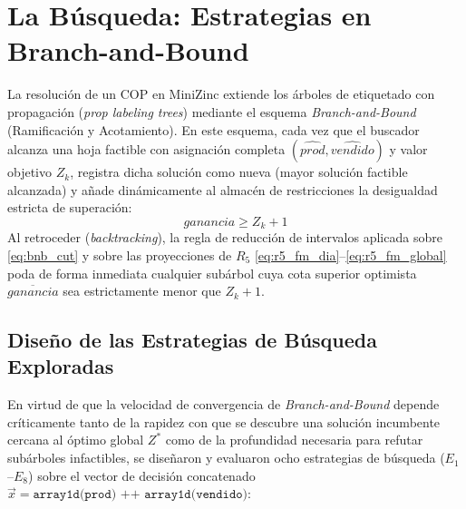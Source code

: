\section{La Búsqueda: Estrategias en Branch-and-Bound}
\label{sec:busqueda}

La resolución de un COP en MiniZinc extiende los árboles de etiquetado con propagación (\emph{prop labeling trees}) mediante el esquema \emph{Branch-and-Bound} (Ramificación y Acotamiento). En este esquema, cada vez que el buscador alcanza una hoja factible con asignación completa $(\widehat{prod}, \widehat{vendido})$ y valor objetivo $Z_k$, registra dicha solución como nueva  (mayor solución factible alcanzada) y añade dinámicamente al almacén de restricciones la desigualdad estricta de superación:
\begin{equation}
    ganancia \ge Z_k + 1
    \label{eq:bnb_cut}
\end{equation}
Al retroceder (\emph{backtracking}), la regla de reducción de intervalos aplicada sobre \eqref{eq:bnb_cut} y sobre las proyecciones de $R_5$ \eqref{eq:r5_fm_dia}--\eqref{eq:r5_fm_global} poda de forma inmediata cualquier subárbol cuya cota superior optimista $\overline{ganancia}$ sea estrictamente menor que $Z_k + 1$.

\subsection{Diseño de las Estrategias de Búsqueda Exploradas}

En virtud de que la velocidad de convergencia de \emph{Branch-and-Bound} depende críticamente tanto de la rapidez con que se descubre una solución incumbente cercana al óptimo global $Z^*$ como de la profundidad necesaria para refutar subárboles infactibles, se diseñaron y evaluaron ocho estrategias de búsqueda ($E_1$--$E_8$) sobre el vector de decisión concatenado $\vec{x} = \texttt{array1d(prod) ++ array1d(vendido)}$:

